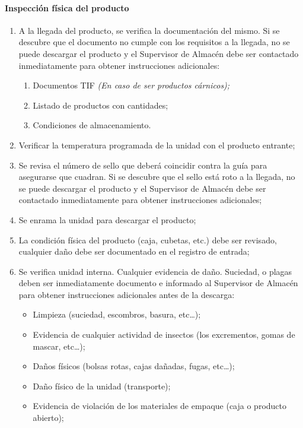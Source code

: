 \paragraph{Inspección física del producto}
\begin{enumerate}
	\item A la llegada del producto, se verifica la documentación del mismo. Si se descubre que el documento no cumple con los requisitos a la llegada, no se puede descargar el producto y el Supervisor de Almacén debe ser contactado inmediatamente para obtener instrucciones adicionales:
	\begin{enumerate}
		\item Documentos TIF \emph{(En caso de ser productos cárnicos);}
		\item Listado de productos con cantidades;
		\item Condiciones de almacenamiento.
	\end{enumerate}
	\item Verificar la temperatura programada de la unidad con el producto entrante;
	\item Se revisa el número de sello que deberá coincidir contra la guía para asegurarse que cuadran. Si se descubre que el sello está roto a la llegada, no se puede descargar el producto y el Supervisor de Almacén debe ser contactado inmediatamente para obtener instrucciones adicionales;
	\item Se enrama la unidad para descargar el producto;
	\item La condición física del producto (caja, cubetas, etc.) debe ser revisado, cualquier daño debe ser documentado en el registro de entrada;
	\item Se verifica unidad interna. Cualquier evidencia de daño. Suciedad, o plagas deben ser inmediatamente documento e informado al Supervisor de Almacén para obtener instrucciones adicionales antes de la descarga:
	\begin{itemize}
		\item Limpieza (suciedad, escombros, basura, etc\dots);
		\item Evidencia de cualquier actividad de insectos (los excrementos, gomas de mascar, etc\dots);
		\item Daños físicos (bolsas rotas, cajas dañadas, fugas, etc\dots);
		\item Daño físico de la unidad (transporte);
		\item Evidencia de violación de los materiales de empaque (caja o producto abierto);

\end{itemize}
\end{enumerate}
